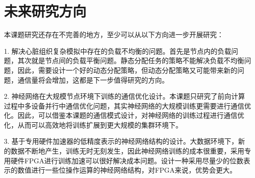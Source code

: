 \section{未来研究方向}
本课题研究还存在不完善的地方，至少可以从以下方向进一步开展研究：
\begin{compactitem}
\item[1.]解决心脏组织复杂模拟中存在的负载不均衡的问题。首先是节点内的负载问题，其次就是节点间的负载平衡问题。静态分配任务的策略不能解决负载不均衡问题，因此，需要设计一个好的动态分配策略，但动态分配策略又可能带来新的问题，通信量将会增加，这都是下一步值得研究的方向。

\item[2.]神经网络在大规模节点环境下训练的通信优化设计。本课题只研究了前向计算过程中多设备并行中通信优化问题，其实神经网络的大规模训练更需要进行通信优化。因此，可以借鉴本课题的通信模式设计，对神经网络的训练过程进行通信优化，从而可以高效地将训练扩展到更大规模的集群环境下。

\item[3.]基于专用硬件加速器的低精度表示的神经网络结构的设计。大数据环境下，新的数据不断地产生，训练无时无刻发生，因此神经网络训练的成本很重要，采用专用硬件FPGA进行训练加速可以很好解决成本问题。设计一种采用尽量少的位数表示的数值进行一些位操作运算的神经网络结构，对FPGA来说，优势会更大。

\end{compactitem}




